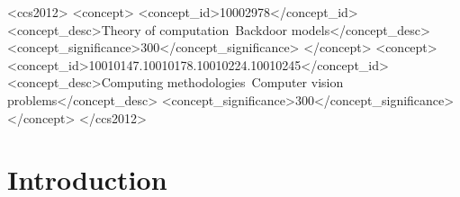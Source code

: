 \documentclass[sigconf,authordraft]{acmart}
\begin{document}
\begin{CCSXML}
<ccs2012>
<concept>
<concept_id>10002978</concept_id>
<concept_desc>Theory of computation~Backdoor models</concept_desc>
<concept_significance>300</concept_significance>
</concept>
<concept>
<concept_id>10010147.10010178.10010224.10010245</concept_id>
<concept_desc>Computing methodologies~Computer vision problems</concept_desc>
<concept_significance>300</concept_significance>
</concept>
</ccs2012>
\end{CCSXML}





\maketitle

\section{Introduction}\label{sec:intro}
\end{document}
